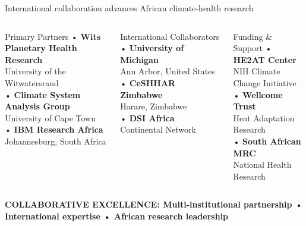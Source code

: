 \documentclass[10pt,aspectratio=169]{beamer}
\begin{document}
\begin{frame}{International collaboration advances African climate-health research}
\begin{columns}[T]
\begin{block}{Primary Partners}
• \textbf{Wits Planetary Health Research} \\
  University of the Witwatersrand \\
\vspace{0.2cm}
• \textbf{Climate System Analysis Group} \\
  University of Cape Town \\
\vspace{0.2cm}
• \textbf{IBM Research Africa} \\
  Johannesburg, South Africa
\end{block}

\begin{block}{International Collaborators}
• \textbf{University of Michigan} \\
  Ann Arbor, United States \\
\vspace{0.2cm}
• \textbf{CeSHHAR Zimbabwe} \\
  Harare, Zimbabwe \\
\vspace{0.2cm}
• \textbf{DSI Africa} \\
  Continental Network
\end{block}

\begin{block}{Funding \& Support}
• \textbf{HE2AT Center} \\
  NIH Climate Change Initiative \\
\vspace{0.2cm}
• \textbf{Wellcome Trust} \\
  Heat Adaptation Research \\
\vspace{0.2cm}
• \textbf{South African MRC} \\
  National Health Research
\end{block}
\end{columns}

\vspace{0.8cm}
\begin{center}
\textcolor{accentorange}{\textbf{COLLABORATIVE EXCELLENCE: Multi-institutional partnership • International expertise • African research leadership}}
\end{center}
\end{frame}
\end{document}
